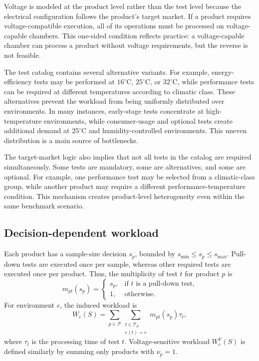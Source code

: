 \documentclass[11pt]{article}
\begin{document}
Voltage is modeled at the product level rather than the test level because the electrical configuration follows the product's target market. If a product requires voltage-compatible execution, all of its operations must be processed on voltage-capable chambers. This one-sided condition reflects practice: a voltage-capable chamber can process a product without voltage requirements, but the reverse is not feasible.

The test catalog contains several alternative variants. For example, energy-efficiency tests may be performed at \(16^\circ\mathrm{C}\), \(25^\circ\mathrm{C}\), or \(32^\circ\mathrm{C}\), while performance tests can be required at different temperatures according to climatic class. These alternatives prevent the workload from being uniformly distributed over environments. In many instances, early-stage tests concentrate at high-temperature environments, while consumer-usage and optional tests create additional demand at \(25^\circ\mathrm{C}\) and humidity-controlled environments. This uneven distribution is a main source of bottlenecks.

The target-market logic also implies that not all tests in the catalog are required simultaneously. Some tests are mandatory, some are alternatives, and some are optional. For example, one performance test may be selected from a climatic-class group, while another product may require a different performance-temperature condition. This mechanism creates product-level heterogeneity even within the same benchmark scenario.

\subsection{Decision-dependent workload}
\label{subsec:workload}

Each product has a sample-size decision \(s_p\), bounded by \(s_{\min} \le s_p \le s_{\max}\). Pull-down tests are executed once per sample, whereas other required tests are executed once per product. Thus, the multiplicity of test \(t\) for product \(p\) is
\[
m_{pt}(s_p)=
\begin{cases}
s_p, & \text{if }t\text{ is a pull-down test,}\\
1, & \text{otherwise.}
\end{cases}
\]
For environment \(e\), the induced workload is
\[
W_e(S)=
\sum_{p\in\mathcal{P}}
\sum_{\substack{t\in\mathcal{T}_p\\e(t)=e}}
m_{pt}(s_p)\tau_t,
\]
where \(\tau_t\) is the processing time of test \(t\). Voltage-sensitive workload \(W_e^V(S)\) is defined similarly by summing only products with \(\nu_p=1\).
\end{document}
